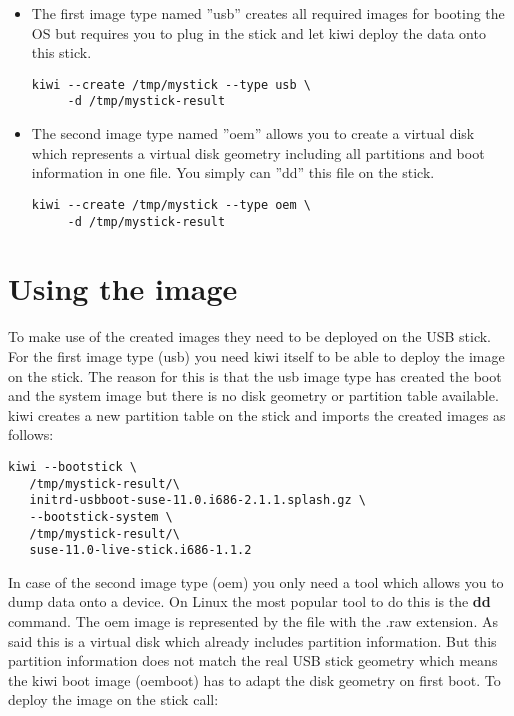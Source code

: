\begin{itemize}
\item The first image type named ''usb'' creates all required
      images for booting the OS but requires you to plug in the stick
      and let kiwi deploy the data onto this stick.

      \begin{Command}{12cm}
      \begin{verbatim}
kiwi --create /tmp/mystick --type usb \
     -d /tmp/mystick-result
      \end{verbatim}
      \end{Command}

\item The second image type named ''oem'' allows you to create a
      virtual disk which represents a virtual disk geometry including
      all partitions and boot information in one file. You simply can ''dd''
      this file on the stick.

      \begin{Command}{12cm}
      \begin{verbatim}
kiwi --create /tmp/mystick --type oem \
     -d /tmp/mystick-result
      \end{verbatim}
      \end{Command}
\end{itemize}

\section{Using the image}

To make use of the created images they need to be deployed on the
USB stick. For the first image type (usb) you need kiwi itself to
be able to deploy the image on the stick. The reason for this is
that the usb image type has created the boot and the system image
but there is no disk geometry or partition table available. kiwi
creates a new partition table on the stick and imports the created
images as follows:

\begin{Command}{13cm}
\begin{verbatim}
kiwi --bootstick \
   /tmp/mystick-result/\
   initrd-usbboot-suse-11.0.i686-2.1.1.splash.gz \
   --bootstick-system \
   /tmp/mystick-result/\
   suse-11.0-live-stick.i686-1.1.2
\end{verbatim}
\end{Command}

In case of the second image type (oem) you only need a tool which allows
you to dump data onto a device. On Linux the most popular tool to do this
is the \textbf{dd} command. The oem image is represented by the file
with the .raw extension. As said this is a virtual disk which already
includes partition information. But this partition information does
not match the real USB stick geometry which means the kiwi boot image
(oemboot) has to adapt the disk geometry on first boot. To deploy the
image on the stick call:

